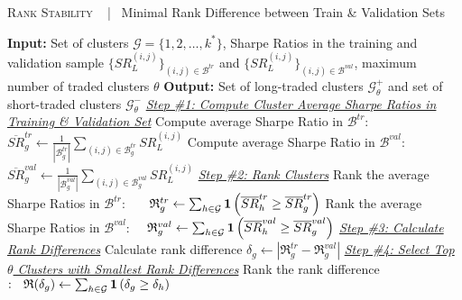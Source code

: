 \begin{algorithm}[H]
\caption{
\textsc{Rank Stability}
~ |~
{{Minimal Rank Difference between Train \& Validation Sets}
}}
\label{alg:rank_stability}
\begin{algorithmic}[1]
\mx 
\State \textbf{Input:} Set of clusters $\mathcal{G} = \{1, 2, \ldots, k^*\}$, Sharpe Ratios in the training and validation sample $\{SR_L^{(i,j)}\}_{(i,j)\in \mathcal B^{tr}}$ and $\{SR_L^{(i,j)}\}_{(i,j)\in \mathcal B^{val}}$, maximum number of traded clusters $\theta$
\mx 
\State \textbf{Output:} Set of long-traded clusters $\mathcal{G}_{\theta}^{+}$ and set of short-traded clusters $\mathcal{G}_{\theta}^{-}$
\mx
\Statex \underline{\textit{Step \#1: Compute Cluster Average Sharpe Ratios in Training \& Validation Set}}
    \State Compute average Sharpe Ratio in $\mathcal B^{tr}:$ ~~
$
\overline{S R}_g^{tr} \leftarrow \frac{1}{|\mathcal{B}_g^{tr} |} \sum_{(i,j) \in \mathcal{B}_g^{tr}} S R_{{{L}}}^{(i,j)}
$
    \State Compute average Sharpe Ratio in $\mathcal B^{val}:$ ~
$
\overline{S R}_g^{val} \leftarrow \frac{1}{|\mathcal{B}_g^{val} |} \sum_{(i,j) \in \mathcal{B}_g^{val}} S R_{{{L}}}^{(i,j)}
$
\EndFor
\mx
\Statex \underline{\textit{Step \#2: Rank Clusters}}
    \State Rank the average Sharpe Ratios in $\mathcal B^{tr}:$ ~~
$
\mathfrak{R}_g^{tr} \leftarrow  \sum_{h \in \mathcal{G}} 
\mathbf{1}\left(
\overline{S R}_h^{t r} \geq \overline{S R}_g^{t r} 
\right)
$
    \State Rank the average Sharpe Ratios in $\mathcal B^{val}:$ ~
$
\mathfrak{R}_g^{val} \leftarrow  \sum_{h \in \mathcal{G}} 
\mathbf{1}\left(
\overline{S R}_h^{val} \geq \overline{S R}_g^{val} 
\right)
$
\EndFor
\mx
\Statex \underline{\textit{Step \#3: Calculate Rank Differences}}
    \State Calculate rank difference $\delta_g \leftarrow | \mathfrak R_g^{tr} - \mathfrak R_g^{val} |$
\EndFor
\mx
\Statex \underline{\textit{Step \#4: Select Top $\theta$ Clusters with Smallest Rank Differences}}
\State Rank the rank difference $:~~ \mathfrak{R}(\delta_g) \leftarrow \sum_{h\in\mathcal{G}} \mathbf{1} \left( \delta_g \geq  \delta_h \right)$

\end{algorithmic}
\end{algorithm}
